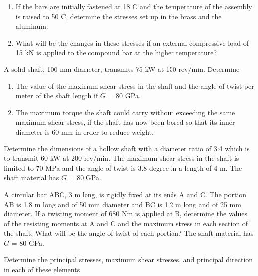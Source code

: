 \documentclass[
10pt,
a4paper,
openany,
svgnames,
]{book}
\newcommand{\AxisRotator}[1][rotate=0]{%
    \tikz[x=0.25cm,y=0.60cm,line width=.2ex,-stealth,#1] \draw(0,0) arc (150:-150:1 and 1);%
}
\newcommand{\exercise}{%
\item \label{lab:\arabic{chapter}-\arabic{exercisesi}}  %
}
\begin{document}
\begin{exercises}
  \begin{enumerate}
  \item If the bars are initially fastened at 18 C and the temperature of the assembly is raised to 50 C, determine the stresses set up in the brass and the aluminum.
  \item What will be the changes in these stresses if an external compressive load of 15 kN is applied to the compound bar at the higher temperature?
  \end{enumerate}
  
  \exercise A solid shaft, 100 mm diameter, transmits 75 kW at 150 rev/min. Determine

    \begin{figure}[H]
    \centering
  \end{figure}
  
  \begin{enumerate}
  \item The value of the maximum shear stress in the shaft and the angle of twist per meter of the shaft length if $G$ = 80 GPa.
  \item The maximum torque the shaft could carry without exceeding the same maximum shear stress, if the shaft has now been bored so that its inner diameter is 60 mm in order to reduce weight.
  \end{enumerate}
  \exercise Determine the dimensions of a hollow shaft with a diameter ratio of 3:4 which is to transmit 60 kW at 200 rev/min. The maximum shear stress in the shaft is limited to 70 MPa and the angle of twist is 3.8 degree in a length of 4 m. The shaft material has $G$ = 80 GPa.
  \exercise A circular bar ABC, 3 m long, is rigidly fixed at its ends A and C. The portion AB is 1.8 m long and of 50 mm diameter and BC is 1.2 m long and of 25 mm diameter. If a twisting moment of 680 Nm is applied at B, determine the values of the resisting moments at A and C and the maximum stress in each section of the shaft. What will be the angle of twist of each portion? The shaft material has $G$ = 80 GPa.
  \exercise Determine the principal stresses, maximum shear stresses, and principal direction in each of these elements
  

\end{exercises}
\end{document}

